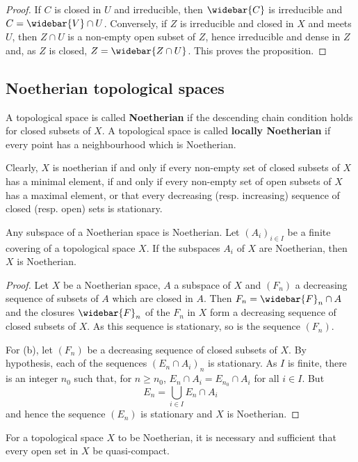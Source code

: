 \begin{proof}
If $C$ is closed in $U$ and irreducible, then $\widebar{C}$ is irreducible and $C=\widebar{V}\cap U$. Conversely, if $Z$ is irreducible and closed in $X$ and meets $U$, then $Z\cap U$ is a non-empty open subset of $Z$, hence irreducible and dense in $Z$ and, as $Z$ is closed, $Z=\widebar{Z\cap U}$. This proves the proposition.
\end{proof}
\subsection{Noetherian topological spaces}
\begin{definition}
A topological space is called \textbf{Noetherian} if the descending chain condition holds for closed subsets of $X$. A topological space is called \textbf{locally Noetherian} if every point has a neighbourhood which is Noetherian.
\end{definition}
Clearly, $X$ is noetherian if and only if every non-empty set of closed subsets of $X$ has a minimal element, if and only if every non-empty set of open subsets of $X$ has a maximal element, or that every decreasing (resp. increasing) sequence of closed (resp. open) sets is stationary.
\begin{proposition}\label{topo space Noe prop}
Any subspace of a Noetherian space is Noetherian. Let $(A_i)_{i\in I}$ be a finite covering of a topological space $X$. If the subspaces $A_i$ of $X$ are Noetherian, then $X$ is Noetherian.
\end{proposition}
\begin{proof}
Let $X$ be a Noetherian space, $A$ a subspace of $X$ and $(F_n)$ a decreasing sequence of subsets of $A$ which are closed in $A$. Then $F_n=\widebar{F}_n\cap A$ and the closures $\widebar{F}_n$ of the $F_n$ in $X$ form a decreasing sequence of closed subsets of $X$. As this sequence is stationary, so is the sequence $(F_n)$.\par
For (b), let $(F_n)$ be a decreasing sequence of closed subsets of $X$. By hypothesis, each of the sequences $(E_n\cap A_i)_n$ is stationary. As $I$ is finite, there is an integer $n_0$ such that, for $n\geq n_0$, $E_n\cap A_i=E_{n_0}\cap A_i$ for all $i\in I$. But
\[E_n=\bigcup_{i\in I}E_n\cap A_i\]
and hence the sequence $(E_n)$ is stationary and $X$ is Noetherian.
\end{proof}
\begin{proposition}\label{topo space Noe iff quasi-compact}
For a topological space $X$ to be Noetherian, it is necessary and sufficient that every open set in $X$ be quasi-compact.
\end{proposition}
